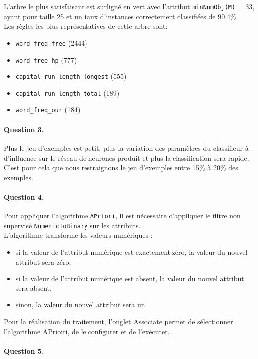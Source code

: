 \documentclass[a4paper,11pt]{article}
\begin{document}
L'arbre le plus \og{}satisfaisant\fg{} est surligné en vert avec l'attribut \texttt{minNumObj(M)} = 33, ayant pour taille 25 et un taux d'instances correctement classifiées de 90,4\%.\\

Les règles les plus représentatives de cette arbre sont:
\begin{itemize}
  \item \texttt{word\_freq\_free} (2444)
  \item \texttt{word\_free\_hp} (777)
  \item \texttt{capital\_run\_length\_longest} (555)
  \item \texttt{capital\_run\_length\_total} (189)
  \item \texttt{word\_freq\_our} (184)
\end{itemize}

\newpage
\paragraph{Question 3.}
Plus le jeu d'exemples est petit, plus la variation des paramètres du classifieur à d'influence sur le réseau de neurones produit et plus la classification sera rapide. C'est pour cela que nous restraignons le jeu d'exemples entre 15\% à 20\% des exemples.\\




\paragraph{Question 4.}
    Pour appliquer l'algorithme \texttt{APriori}, il est nécessaire d'appliquer le filtre non supervisé \texttt{NumericToBinary} sur les attributs. \\
    
    L’algorithme transforme les valeurs numériques : 
    \begin{itemize}
	\item si la valeur de l'attribut numérique est exactement zéro, la valeur du nouvel attribut sera zéro,
	\item si la valeur de l'attribut numérique est absent, la valeur du nouvel attribut sera absent,
	\item sinon, la valeur du nouvel attribut sera un.\\
	\end{itemize}
	
    Pour la réalisation du traitement, l'onglet \og{}Associate\fg{} permet de sélectionner  l'algorithme APrioiri, de le configurer et de l'exécuter.

\paragraph{Question 5.}
	


				
		
\end{document}
